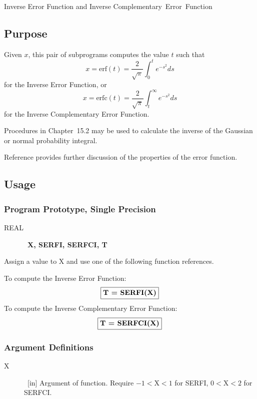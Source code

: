 \documentclass[twoside]{MATH77}
\begin{document}
 Inverse Error Function and Inverse \hbox{Complementary Error Function}


\subsection{Purpose}

Given $x$, this pair of subprograms computes the value $t$ such that%
\begin{equation*}
x=\text{erf}(t)=\frac 2{\sqrt{\pi }}\int_0^te^{-s^2}ds
\end{equation*}
for the Inverse Error Function, or%
\begin{equation*}
x=\text{erfc}(t)=\frac 2{\sqrt{\pi }}\int_t^\infty e^{-s^2}ds
\end{equation*}
for the Inverse Complementary Error Function.

Procedures in Chapter~15.2 may be used to calculate the inverse of
the Gaussian or normal probability integral.

Reference \cite{ams55:erf} provides further discussion of the properties
of the error function.

\subsection{Usage}

\subsubsection{Program Prototype, Single Precision}

\begin{description}
\item[REAL]  \ {\bf X, SERFI, SERFCI, T}
\end{description}

Assign a value to X and use one of the following function references.

To compute the Inverse Error Function:
$$
\fbox{{\bf T = SERFI(X)}}
$$
To compute the Inverse Complementary Error Function:
$$
\fbox{{\bf T = SERFCI(X)}}
$$

\subsubsection{Argument Definitions}

\begin{description}
\item[X]  \ [in] Argument of function. Require $-1<\text{X}<1$ for SERFI, $0<%
\text{X}<2$ for SERFCI.
\end{description}
\end{document}
